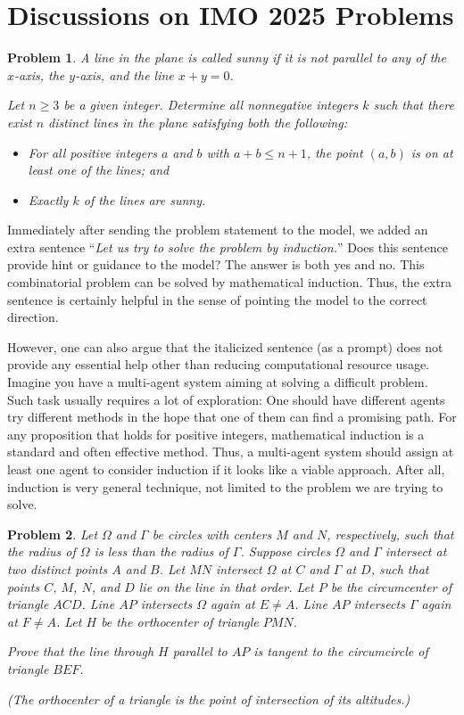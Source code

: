 \documentclass[12pt]{article}
\newtheorem{problem}{Problem}
\begin{document}
\section{Discussions on IMO 2025 Problems}

\begin{problem}
A line in the plane is called \textit{sunny} if it is not parallel to any of the $x$-axis, the $y$-axis, and the line $x+y=0$.

Let $n \ge 3$ be a given integer. Determine all nonnegative integers $k$ such that there exist $n$ distinct lines in the plane satisfying both the following:
\begin{itemize}
    \item For all positive integers $a$ and $b$ with $a + b \le n + 1$, the point $(a,b)$ is on at least one of the lines; and
    \item Exactly $k$ of the lines are sunny.
\end{itemize}
\end{problem}

Immediately after sending the problem statement to the model, we added an extra sentence ``\emph{Let us try to solve the problem by induction.}'' Does this sentence provide hint or guidance to the model? The answer is both yes and no. This combinatorial problem can be solved by mathematical induction. Thus, the extra sentence is certainly helpful in the sense of pointing the model to the correct direction.

However, one can also argue that the italicized sentence (as a prompt) does not provide any essential help other than reducing computational resource usage. Imagine you have a multi-agent system aiming at solving a difficult problem. Such task usually requires a lot of exploration: One should have different agents try different methods in the hope that one of them can find a promising path. For any proposition that holds for positive integers, mathematical induction is a standard and often effective method. Thus, a multi-agent system should assign at least one agent to consider induction if it looks like a viable approach. After all, induction is very general technique, not limited to the problem we are trying to solve.

\begin{problem}
Let $\Omega$ and $\Gamma$ be circles with centers $M$ and $N$, respectively, such that the radius of $\Omega$ is less than the radius of $\Gamma$. Suppose circles $\Omega$ and $\Gamma$ intersect at two distinct points $A$ and $B$. Let $MN$ intersect $\Omega$ at $C$ and $\Gamma$ at $D$, such that points $C$, $M$, $N$, and $D$ lie on the line in that order. Let $P$ be the circumcenter of triangle $ACD$. Line $AP$ intersects $\Omega$ again at $E \ne A$. Line $AP$ intersects $\Gamma$ again at $F \ne A$. Let $H$ be the orthocenter of triangle $PMN$.

Prove that the line through $H$ parallel to $AP$ is tangent to the circumcircle of triangle $BEF$.

(The orthocenter of a triangle is the point of intersection of its altitudes.)
\end{problem}
\end{document}
